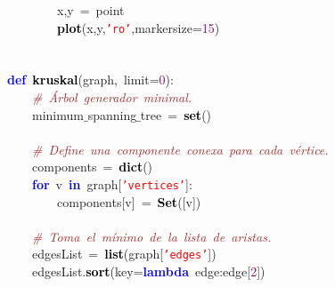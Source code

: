 \mbox{}\ \ \ \ \ \ \ \ x\textcolor{BrickRed}{,}y\ \textcolor{BrickRed}{=}\ point \\
\mbox{}\ \ \ \ \ \ \ \ \textbf{\textcolor{Black}{plot}}\textcolor{BrickRed}{(}x\textcolor{BrickRed}{,}y\textcolor{BrickRed}{,}\texttt{\textcolor{Red}{'ro'}}\textcolor{BrickRed}{,}markersize\textcolor{BrickRed}{=}\textcolor{Purple}{15}\textcolor{BrickRed}{)} \\
\mbox{} \\
\mbox{} \\
\mbox{}\textbf{\textcolor{Blue}{def}}\ \textbf{\textcolor{Black}{kruskal}}\textcolor{BrickRed}{(}graph\textcolor{BrickRed}{,}\ limit\textcolor{BrickRed}{=}\textcolor{Purple}{0}\textcolor{BrickRed}{):} \\
\mbox{}\ \ \ \ \textit{\textcolor{Brown}{\#\ Árbol\ generador\ minimal.}} \\
\mbox{}\ \ \ \ minimum$\_$spanning$\_$tree\ \textcolor{BrickRed}{=}\ \textbf{\textcolor{Black}{set}}\textcolor{BrickRed}{()} \\
\mbox{} \\
\mbox{}\ \ \ \ \textit{\textcolor{Brown}{\#\ Define\ una\ componente\ conexa\ para\ cada\ vértice.}} \\
\mbox{}\ \ \ \ components\ \textcolor{BrickRed}{=}\ \textbf{\textcolor{Black}{dict}}\textcolor{BrickRed}{()} \\
\mbox{}\ \ \ \ \textbf{\textcolor{Blue}{for}}\ v\ \textbf{\textcolor{Blue}{in}}\ graph\textcolor{BrickRed}{[}\texttt{\textcolor{Red}{'vertices'}}\textcolor{BrickRed}{]:} \\
\mbox{}\ \ \ \ \ \ \ \ components\textcolor{BrickRed}{[}v\textcolor{BrickRed}{]}\ \textcolor{BrickRed}{=}\ \textbf{\textcolor{Black}{Set}}\textcolor{BrickRed}{([}v\textcolor{BrickRed}{])} \\
\mbox{}\ \ \ \  \\
\mbox{}\ \ \ \ \textit{\textcolor{Brown}{\#\ Toma\ el\ mínimo\ de\ la\ lista\ de\ aristas.}} \\
\mbox{}\ \ \ \ edgesList\ \textcolor{BrickRed}{=}\ \textbf{\textcolor{Black}{list}}\textcolor{BrickRed}{(}graph\textcolor{BrickRed}{[}\texttt{\textcolor{Red}{'edges'}}\textcolor{BrickRed}{])} \\
\mbox{}\ \ \ \ edgesList\textcolor{BrickRed}{.}\textbf{\textcolor{Black}{sort}}\textcolor{BrickRed}{(}key\textcolor{BrickRed}{=}\textbf{\textcolor{Blue}{lambda}}\ edge\textcolor{BrickRed}{:}edge\textcolor{BrickRed}{[}\textcolor{Purple}{2}\textcolor{BrickRed}{])} \\
\mbox{} \\
